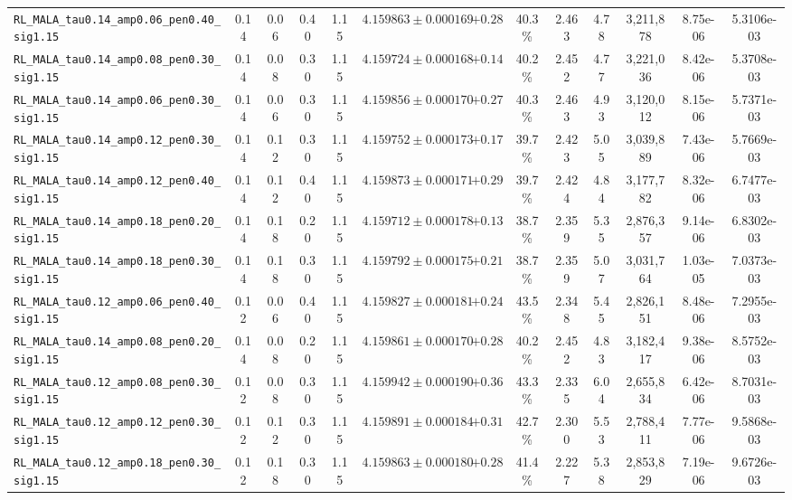 \documentclass[10pt,a4paper]{article}
\begin{document}
\begin{table}[H]
\begin{adjustbox}{max width=\textwidth}
\begin{tabular}{lcccccccccccc}
\texttt{RL\_MALA\_tau0.14\_amp0.06\_pen0.40\_sig1.15} & 0.14 & 0.06 & 0.40 & 1.15 & $4.159863 \pm 0.000169$ & $+0.28$ & 40.3\% & 2.463 & 4.78 & 3,211,878 & 8.75e-06 & 5.3106e-03 \\
\texttt{RL\_MALA\_tau0.14\_amp0.08\_pen0.30\_sig1.15} & 0.14 & 0.08 & 0.30 & 1.15 & $4.159724 \pm 0.000168$ & $+0.14$ & 40.2\% & 2.452 & 4.77 & 3,221,036 & 8.42e-06 & 5.3708e-03 \\
\texttt{RL\_MALA\_tau0.14\_amp0.06\_pen0.30\_sig1.15} & 0.14 & 0.06 & 0.30 & 1.15 & $4.159856 \pm 0.000170$ & $+0.27$ & 40.3\% & 2.463 & 4.93 & 3,120,012 & 8.15e-06 & 5.7371e-03 \\
\texttt{RL\_MALA\_tau0.14\_amp0.12\_pen0.30\_sig1.15} & 0.14 & 0.12 & 0.30 & 1.15 & $4.159752 \pm 0.000173$ & $+0.17$ & 39.7\% & 2.423 & 5.05 & 3,039,889 & 7.43e-06 & 5.7669e-03 \\
\texttt{RL\_MALA\_tau0.14\_amp0.12\_pen0.40\_sig1.15} & 0.14 & 0.12 & 0.40 & 1.15 & $4.159873 \pm 0.000171$ & $+0.29$ & 39.7\% & 2.424 & 4.84 & 3,177,782 & 8.32e-06 & 6.7477e-03 \\
\texttt{RL\_MALA\_tau0.14\_amp0.18\_pen0.20\_sig1.15} & 0.14 & 0.18 & 0.20 & 1.15 & $4.159712 \pm 0.000178$ & $+0.13$ & 38.7\% & 2.359 & 5.35 & 2,876,357 & 9.14e-06 & 6.8302e-03 \\
\texttt{RL\_MALA\_tau0.14\_amp0.18\_pen0.30\_sig1.15} & 0.14 & 0.18 & 0.30 & 1.15 & $4.159792 \pm 0.000175$ & $+0.21$ & 38.7\% & 2.359 & 5.07 & 3,031,764 & 1.03e-05 & 7.0373e-03 \\
\texttt{RL\_MALA\_tau0.12\_amp0.06\_pen0.40\_sig1.15} & 0.12 & 0.06 & 0.40 & 1.15 & $4.159827 \pm 0.000181$ & $+0.24$ & 43.5\% & 2.348 & 5.45 & 2,826,151 & 8.48e-06 & 7.2955e-03 \\
\texttt{RL\_MALA\_tau0.14\_amp0.08\_pen0.20\_sig1.15} & 0.14 & 0.08 & 0.20 & 1.15 & $4.159861 \pm 0.000170$ & $+0.28$ & 40.2\% & 2.452 & 4.83 & 3,182,417 & 9.38e-06 & 8.5752e-03 \\
\texttt{RL\_MALA\_tau0.12\_amp0.08\_pen0.30\_sig1.15} & 0.12 & 0.08 & 0.30 & 1.15 & $4.159942 \pm 0.000190$ & $+0.36$ & 43.3\% & 2.335 & 6.04 & 2,655,834 & 6.42e-06 & 8.7031e-03 \\
\texttt{RL\_MALA\_tau0.12\_amp0.12\_pen0.30\_sig1.15} & 0.12 & 0.12 & 0.30 & 1.15 & $4.159891 \pm 0.000184$ & $+0.31$ & 42.7\% & 2.300 & 5.53 & 2,788,411 & 7.77e-06 & 9.5868e-03 \\
\texttt{RL\_MALA\_tau0.12\_amp0.18\_pen0.30\_sig1.15} & 0.12 & 0.18 & 0.30 & 1.15 & $4.159863 \pm 0.000180$ & $+0.28$ & 41.4\% & 2.227 & 5.38 & 2,853,829 & 7.19e-06 & 9.6726e-03 \\

\end{tabular}
\end{adjustbox}
\end{table}
\end{document}
